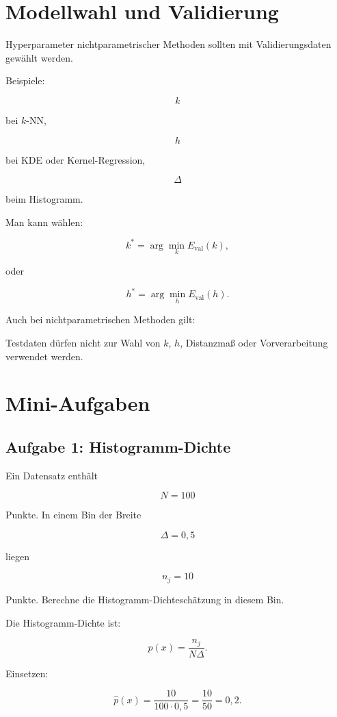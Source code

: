 \section{Modellwahl und Validierung}

Hyperparameter nichtparametrischer Methoden sollten mit Validierungsdaten gewählt werden.

Beispiele:

\[
    k
\]

bei \(k\)-NN,

\[
    h
\]

bei KDE oder Kernel-Regression,

\[
    \Delta
\]

beim Histogramm.

Man kann wählen:

\[
    k^*
    =
    \arg\min_k
    E_{\mathrm{val}}(k),
\]

oder

\[
    h^*
    =
    \arg\min_h
    E_{\mathrm{val}}(h).
\]

\begin{examtipbox}
Auch bei nichtparametrischen Methoden gilt:

Testdaten dürfen nicht zur Wahl von \(k\), \(h\), Distanzmaß oder Vorverarbeitung verwendet werden.
\end{examtipbox}

\section{Mini-Aufgaben}

\subsection{Aufgabe 1: Histogramm-Dichte}

Ein Datensatz enthält

\[
    N=100
\]

Punkte.
In einem Bin der Breite

\[
    \Delta=0{,}5
\]

liegen

\[
    n_j=10
\]

Punkte.
Berechne die Histogramm-Dichteschätzung in diesem Bin.

\begin{examplebox}
Die Histogramm-Dichte ist:

\[
    \hat{p}(x)
    =
    \frac{n_j}{N\Delta}.
\]

Einsetzen:

\[
    \hat{p}(x)
    =
    \frac{10}{100\cdot 0{,}5}
    =
    \frac{10}{50}
    =
    0{,}2.
\]
\end{examplebox}

